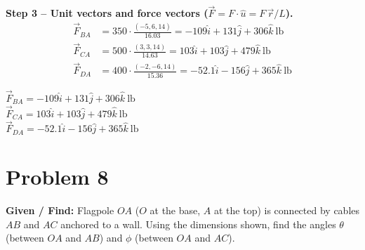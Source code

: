 \documentclass[11pt]{article}
\newcommand{\eqlabel}[1]{\textbf{#1}}
\begin{document}
\eqlabel{Step 3 -- Unit vectors and force vectors ($\vec{F}=F\cdot \hat u = F\,\vec r/L$).}
\begin{align*}
    \vec{F}_{BA} &= 350\cdot\frac{(-5,6,14)}{16.03} = -109\hat i+131\hat j+306\hat k\ \text{lb} \\
    \vec{F}_{CA} &= 500\cdot\frac{(3,3,14)}{14.63} = 103\hat i+103\hat j+479\hat k\ \text{lb} \\
    \vec{F}_{DA} &= 400\cdot\frac{(-2,-6,14)}{15.36} = -52.1\hat i-156\hat j+365\hat k\ \text{lb}
\end{align*}

\begin{finalanswer}
    $\vec{F}_{BA} = -109\hat i+131\hat j+306\hat k\ \text{lb}$ \\
    $\vec{F}_{CA} = 103\hat i+103\hat j+479\hat k\ \text{lb}$ \\
    $\vec{F}_{DA} = -52.1\hat i-156\hat j+365\hat k\ \text{lb}$
\end{finalanswer}

\clearpage
\section*{Problem 8}

\textbf{Given / Find:} Flagpole $OA$ ($O$ at the base, $A$ at the top) is connected by cables $AB$ and $AC$ anchored to a wall. Using the dimensions shown, find the angles $\theta$ (between $OA$ and $AB$) and $\phi$ (between $OA$ and $AC$).
\end{document}
